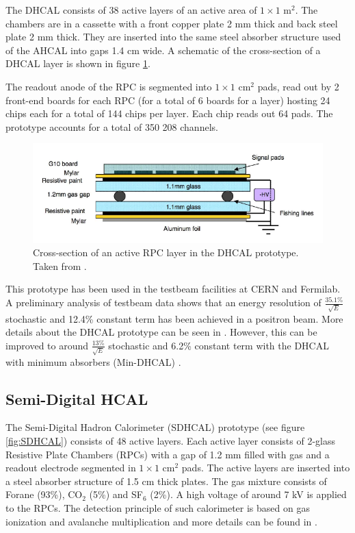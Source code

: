 The DHCAL consists of 38 active layers of an active area of $1\times1$ m$^2$. The chambers are in a cassette with a front copper plate 2 mm thick and back steel plate 2 mm thick. They are inserted into the same steel absorber structure used of the AHCAL into gaps 1.4 cm wide. A schematic of the cross-section of a DHCAL layer is shown in figure \ref{fig:DHCALCross}.

The readout anode of the RPC is segmented into $1\times1$ cm$^2$ pads, read out by 2 front-end boards for each RPC (for a total of 6 boards for a layer) hosting 24 chips each for a total of 144 chips per layer. Each chip reads out 64 pads. The prototype accounts for a total of 350 208 channels.

\begin{figure}[htbp!]
  \centering
  \includegraphics[width=0.9\linewidth]{chap3/fig/Cross-section-DHCAL.png}
  \caption{Cross-section of an active RPC layer in the DHCAL prototype. Taken from \cite{1748-0221-3-05-P05001}.} \label{fig:DHCALCross}
\end{figure}

This prototype has been used in the testbeam facilities at CERN and Fermilab. A preliminary analysis of testbeam data shows that an energy resolution of $\frac{35.1\%}{\sqrt{E}}$ stochastic and 12.4\% constant term has been achieved in a positron beam. More details about the DHCAL prototype can be seen in \cite{Neubueser2016}. However, this can be improved to around $\frac{13\%}{\sqrt{E}}$ stochastic and 6.2\% constant term with the DHCAL with minimum absorbers (Min-DHCAL) \cite{Freund:2016wvz}.

\subsection{Semi-Digital HCAL}

The Semi-Digital Hadron Calorimeter (SDHCAL) prototype \cite{1748-0221-10-10-P10039} (see figure \ref{fig:SDHCAL}) consists of 48 active layers. Each active layer consists of 2-glass Resistive Plate Chambers (RPCs) \cite{BEDJIDIAN2010120} with a gap of 1.2 mm filled with gas and a readout electrode segmented in $1\times1$ cm$^2$ pads. The active layers are inserted into a steel absorber structure of 1.5 cm thick plates. The gas mixture consists of Forane (93\%), CO$_2$ (5\%) and SF$_6$ (2\%). A high voltage of around 7 kV is applied to the RPCs. The detection principle of such calorimeter is based on gas ionization and avalanche multiplication and more details can be found in \cite{1748-0221-10-10-P10039}.

